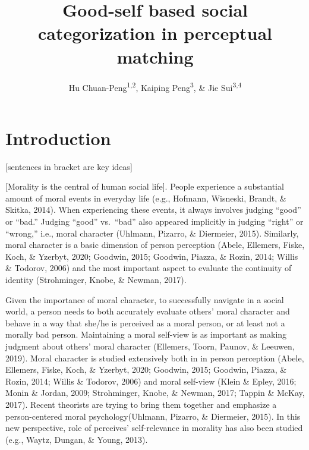 \documentclass[
  english,
  man]{apa6}
\author{Hu Chuan-Peng\textsuperscript{1,2}, Kaiping Peng\textsuperscript{3}, \& Jie Sui\textsuperscript{3,4}}
\affiliation{
\vspace{0.5cm}
\textsuperscript{1} School of Psychology, Nanjing Normal University\\\textsuperscript{2} Leibniz Institute for Resilience Research, 55131 Mainz, Germany\\\textsuperscript{3} Tsinghua University, 100084 Beijing, China\\\textsuperscript{4} University of Aberdeen, Aberdeen, Scotland}
\title{Good-self based social categorization in perceptual matching}
\date{}
\begin{document}
\maketitle

\hypertarget{introduction}{%
\section{Introduction}\label{introduction}}

{[}sentences in bracket are key ideas{]}

{[}Morality is the central of human social life{]}. People experience a substantial amount of moral events in everyday life (e.g., Hofmann, Wisneski, Brandt, \& Skitka, 2014). When experiencing these events, it always involves judging ``good'' or ``bad.'' Judging ``good'' vs.~``bad'' also appeared implicitly in judging ``right'' or ``wrong,'' i.e., moral character (Uhlmann, Pizarro, \& Diermeier, 2015). Similarly, moral character is a basic dimension of person perception (Abele, Ellemers, Fiske, Koch, \& Yzerbyt, 2020; Goodwin, 2015; Goodwin, Piazza, \& Rozin, 2014; Willis \& Todorov, 2006) and the most important aspect to evaluate the continuity of identity (Strohminger, Knobe, \& Newman, 2017).

Given the importance of moral character, to successfully navigate in a social world, a person needs to both accurately evaluate others' moral character and behave in a way that she/he is perceived as a moral person, or at least not a morally bad person. Maintaining a moral self-view is as important as making judgment about others' moral character (Ellemers, Toorn, Paunov, \& Leeuwen, 2019). Moral character is studied extensively both in in person perception (Abele, Ellemers, Fiske, Koch, \& Yzerbyt, 2020; Goodwin, 2015; Goodwin, Piazza, \& Rozin, 2014; Willis \& Todorov, 2006) and moral self-view (Klein \& Epley, 2016; Monin \& Jordan, 2009; Strohminger, Knobe, \& Newman, 2017; Tappin \& McKay, 2017). Recent theorists are trying to bring them together and emphasize a person-centered moral psychology(Uhlmann, Pizarro, \& Diermeier, 2015). In this new perspective, role of perceives' self-relevance in morality has also been studied (e.g., Waytz, Dungan, \& Young, 2013).
\end{document}
